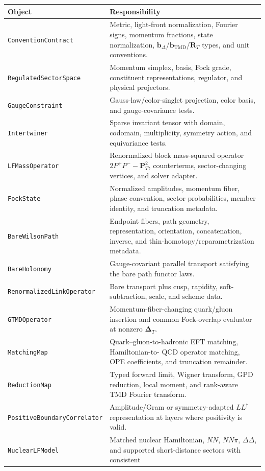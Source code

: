 \documentclass[11pt]{article}
\newcommand{\DT}{\bm{\Delta}_{T}}
\newcommand{\bD}{\bm{b}_{\Delta}}
\newcommand{\bM}{\bm{b}_{\mathrm{TMD}}}
\newcommand{\RT}{\bm{R}_{T}}
\begin{document}
\begin{longtable}{L{0.27\textwidth}L{0.65\textwidth}}
\toprule
Object & Responsibility\\
\midrule
\endhead
\texttt{ConventionContract} & Metric, light-front normalization, Fourier
signs, momentum fractions, state normalization, \(\bD\)/\(\bM\)/\(\RT\)
types, and unit conventions.\\
\texttt{RegulatedSectorSpace} & Momentum simplex, basis, Fock grade,
constituent representations, regulator, and physical projectors.\\
\texttt{GaugeConstraint} & Gauss-law/color-singlet projection, color basis,
and gauge-covariance tests.\\
\texttt{Intertwiner} & Sparse invariant tensor with domain, codomain,
multiplicity, symmetry action, and equivariance tests.\\
\texttt{LFMassOperator} & Renormalized block mass-squared operator
\(2P^+P^- -\bm P_T^2\), counterterms, sector-changing vertices, and solver
adapter.\\
\texttt{FockState} & Normalized amplitudes, momentum fiber, phase convention,
sector probabilities, member identity, and truncation metadata.\\
\texttt{BareWilsonPath} & Endpoint fibers, path geometry, representation,
orientation, concatenation, inverse, and thin-homotopy/reparametrization
metadata.\\
\texttt{BareHolonomy} & Gauge-covariant parallel transport satisfying the
bare path functor laws.\\
\texttt{RenormalizedLink\allowbreak Operator} & Bare transport plus cusp, rapidity,
soft-subtraction, scale, and scheme data.\\
\texttt{GTMDOperator} & Momentum-fiber-changing quark/gluon insertion and
common Fock-overlap evaluator at nonzero \(\DT\).\\
\texttt{MatchingMap} & Quark--gluon-to-hadronic EFT matching, Hamiltonian-to-
QCD operator matching, OPE coefficients, and truncation remainder.\\
\texttt{ReductionMap} & Typed forward limit, Wigner transform, GPD reduction,
local moment, and rank-aware TMD Fourier transform.\\
\texttt{PositiveBoundary\allowbreak Correlator} & Amplitude/Gram or symmetry-adapted
\(LL^\dagger\) representation at layers where positivity is valid.\\
\texttt{NuclearLFModel} & Matched nuclear Hamiltonian, \(NN\), \(NN\pi\),
\(\Delta\Delta\), and supported short-distance sectors with consistent

\end{longtable}
\end{document}
